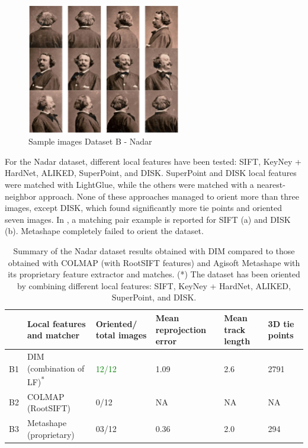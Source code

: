 \begin{figure}
    \centering
    \includegraphics[width=0.6\textwidth]{nadar_images}
    \caption{Sample images Dataset B - Nadar}
    \label{fig:5:nadar_images}
\end{figure}

For the Nadar dataset, different local features have been tested: SIFT, KeyNey + HardNet, ALIKED, SuperPoint, and DISK.
SuperPoint and DISK local features were matched with LightGlue, while the others were matched with a nearest-neighbor approach. 
None of these approaches managed to orient more than three images, except DISK, which found significantly more tie points and oriented seven images. 
In , a matching pair example is reported for SIFT (a) and DISK (b).
Metashape completely failed to orient the dataset. 

\begin{table}
    \centering
    \caption{Summary of the Nadar dataset results obtained with DIM compared to those obtained with COLMAP (with RootSIFT features) and Agisoft Metashape with its proprietary feature extractor and matches. (*) The dataset has been oriented by combining different local features: SIFT, KeyNey + HardNet, ALIKED, SuperPoint, and DISK.} 
    \label{tab:5:nadar_summary}
    
    \begin{tabular}{l p{3.5cm} p{2.2cm} p{2.2cm} p{2.2cm} p{2.2cm}}
    \toprule
    &Local features \newline and matcher & Oriented/ \newline total images & Mean reprojection error \newline [px] & Mean track \newline length &  3D tie points\\
    \midrule
    B1 &DIM \newline (combination of LF)\textsuperscript{*}    & \textcolor{green}{12/12}     & 1.09  & 2.6   & 2791 \\
    B2 &COLMAP \newline(RootSIFT)                     & 0/12      & NA    & NA    & NA   \\
    B3 &Metashape \newline (proprietary)              & 03/12     & 0.36  & 2.0   & 294  \\
    \bottomrule
    \end{tabular}
\end{table}


